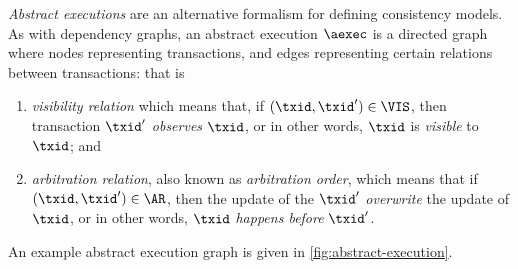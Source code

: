 \emph{Abstract executions} \citep{ev_transactions,framework-concur} 
are an alternative formalism for defining consistency models. 
As with dependency graphs, an abstract execution \(\aexec\)
is a directed graph where nodes representing transactions,
and edges representing certain relations between transactions: that is
\begin{enumerate}
\item \emph{visibility relation} which means that,
if \( (\txid,\txid') \in \VIS \), 
then transaction \( \txid' \) \emph{observes} \( \txid \),
or in other words, \( \txid \) is \emph{visible} to \( \txid \); and
\item \emph{arbitration relation}, also known as \emph{arbitration order},
which means that
if \( (\txid,\txid') \in \AR \),
then the update of the \( \txid' \) \emph{overwrite} the update of \( \txid \),
or in other words, \( \txid \) \emph{happens before} \( \txid' \).
\end{enumerate}
An example abstract execution graph is given in \cref{fig:abstract-execution}. 



